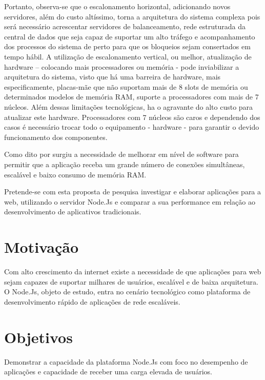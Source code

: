   Portanto, observa-se que o escalonamento horizontal, adicionando novos servidores, além do custo altíssimo, 
  torna a arquitetura do sistema complexa pois será necessário acrescentar servidores de balanceamento, 
  rede estruturada da central de dados que seja capaz de suportar um alto tráfego e acompanhamento dos processos 
  do sistema de perto para que os bloqueios sejam consertados em tempo hábil. A utilização de escalonamento vertical, 
  ou melhor, atualização de hardware – colocando mais processadores ou memória - pode inviabilizar a arquitetura do 
  sistema, visto que há uma barreira de hardware, mais especificamente, placas-mãe que não suportam mais de 8 slots 
  de memória ou determinados modelos de memória RAM, suporte a processadores com mais de 7 núcleos. 
  Além dessas limitações tecnológicas, ha o agravante do alto custo para atualizar este hardware. 
  Processadores com 7 núcleos são caros e dependendo dos casos é necessário trocar todo o equipamento - hardware - 
  para garantir o devido funcionamento dos componentes.
  
  Como dito por \cite{Oliveira:2012} surgiu a necessidade de melhorar em nível de software para permitir que a aplicação
  receba um grande número de conexões simultâneas, escalável e baixo consumo de memória RAM.
  
  Pretende-se com esta proposta de pesquisa investigar e elaborar aplicações para a web, 
  utilizando o servidor Node.Js e comparar a sua performance em relação ao desenvolvimento
  de aplicativos tradicionais.
  
  
\section{Motivação}
\label{motivacao}
  
  Com alto crescimento da internet existe a necessidade de que aplicações para web sejam capazes de suportar milhares de usuários,
  escalável e de baixa arquitetura. O Node.Js, objeto de estudo, entra no cenário tecnológico como plataforma de desenvolvimento rápido
  de aplicações de rede escaláveis.
  
\section{Objetivos}
\label{objetivos}

  Demonstrar a capacidade da plataforma Node.Js com foco no desempenho de aplicações e capacidade de receber uma carga
  elevada de usuários.

